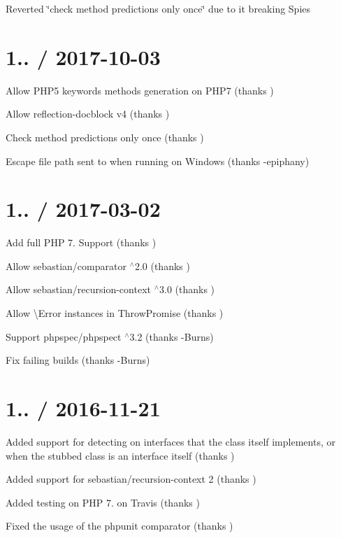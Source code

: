 
\begin{DoxyItemize}
\item Reverted \char`\"{}check method predictions only once\char`\"{} due to it breaking Spies
\end{DoxyItemize}

\section*{1.. / 2017-\/10-\/03 }


\begin{DoxyItemize}
\item Allow P\+H\+P5 keywords methods generation on P\+H\+P7 (thanks )
\item Allow reflection-\/docblock v4 (thanks )
\item Check method predictions only once (thanks )
\item Escape file path sent to  when running on Windows (thanks -\/epiphany)
\end{DoxyItemize}

\section*{1.. / 2017-\/03-\/02 }


\begin{DoxyItemize}
\item Add full P\+HP 7. Support (thanks )
\item Allow {\ttfamily sebastian/comparator $^\wedge$2.0} (thanks )
\item Allow {\ttfamily sebastian/recursion-\/context $^\wedge$3.0} (thanks )
\item Allow {\ttfamily \textbackslash{}Error} instances in {\ttfamily Throw\+Promise} (thanks )
\item Support {\ttfamily phpspec/phpspect $^\wedge$3.2} (thanks -\/\+Burns)
\item Fix failing builds (thanks -\/\+Burns)
\end{DoxyItemize}

\section*{1.. / 2016-\/11-\/21 }


\begin{DoxyItemize}
\item Added support for detecting  on interfaces that the class itself implements, or when the stubbed class is an interface itself (thanks )
\item Added support for sebastian/recursion-\/context 2 (thanks )
\item Added testing on P\+HP 7. on Travis (thanks )
\item Fixed the usage of the phpunit comparator (thanks )
\end{DoxyItemize}

